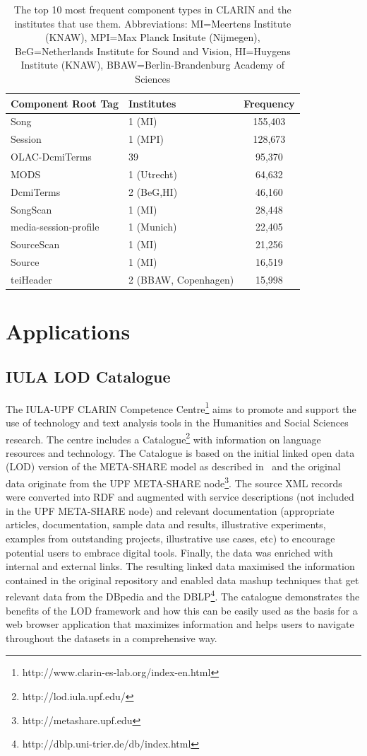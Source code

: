 \documentclass{llncs}
\begin{document}
\begin{table}
\begin{center}
\begin{tabular}{l|lc}
Component Root Tag & Institutes & Frequency \\
\hline
Song & 1 (MI) & 155,403 \\
Session & 1 (MPI) & 128,673 \\
OLAC-DcmiTerms & 39 & 95,370 \\
MODS & 1 (Utrecht)& 64,632 \\
DcmiTerms & 2 (BeG,HI) & 46,160 \\
SongScan & 1 (MI) & 28,448 \\
media-session-profile & 1 (Munich) & 22,405 \\
SourceScan & 1 (MI) & 21,256 \\
Source & 1 (MI) & 16,519 \\
teiHeader & 2 (BBAW, Copenhagen) & 15,998 \\
\end{tabular}
\end{center}
\caption{\label{tab:clarin-types}The top 10 most frequent component types in
CLARIN and the institutes that use them. Abbreviations: MI=Meertens Institute (KNAW),
MPI=Max Planck Insitute (Nijmegen), BeG=Netherlands Institute for Sound and Vision,
HI=Huygens Institute (KNAW), BBAW=Berlin-Brandenburg Academy of Sciences}
\end{table}
\section{Applications}
\label{sec:applications}
\subsection{IULA LOD Catalogue}
\label{sec:iulalod}
The IULA-UPF CLARIN Competence
Centre\footnote{http://www.clarin-es-lab.org/index-en.html} aims to promote and
support the use of technology and text analysis tools in the Humanities and
Social Sciences research. The centre includes a
Catalogue\footnote{http://lod.iula.upf.edu/} with information on language
resources and technology. The Catalogue is based on the initial linked open data
(LOD) version of the META-SHARE model as described in~\cite{Villegas2014} and
the original data originate from the UPF META-SHARE
node\footnote{http://metashare.upf.edu}. The source XML records were converted
into RDF and augmented with service descriptions (not included in the UPF
META-SHARE node) and relevant documentation (appropriate articles,
documentation, sample data and results, illustrative experiments, examples from
outstanding projects, illustrative use cases, etc) to encourage potential users
to embrace digital tools. Finally, the data was enriched with internal and
external links. The resulting linked data maximised the information
contained in the original repository and enabled data mashup techniques that get
relevant data from the DBpedia and the
DBLP\footnote{http://dblp.uni-trier.de/db/index.html}. The catalogue
demonstrates the benefits of the LOD framework and how this can be easily used
as the basis for a web browser application that maximizes information and helps
users to navigate throughout the datasets in a comprehensive way.
\end{document}
